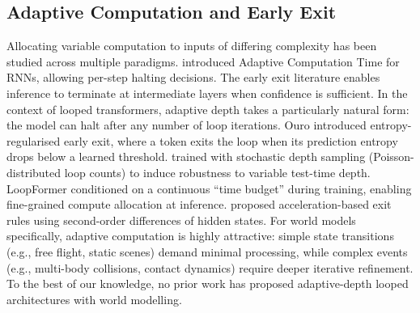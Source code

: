 \subsection{Adaptive Computation and Early Exit}

Allocating variable computation to inputs of differing complexity has been studied across multiple paradigms. \citet{graves2016act} introduced Adaptive Computation Time for RNNs, allowing per-step halting decisions. The early exit literature \citep{teerapittayanon2016branchynet, bolukbasi2017adaptive, earlyexit2025survey} enables inference to terminate at intermediate layers when confidence is sufficient. In the context of looped transformers, adaptive depth takes a particularly natural form: the model can halt after any number of loop iterations. Ouro \citep{zhu2025ouro} introduced entropy-regularised early exit, where a token exits the loop when its prediction entropy drops below a learned threshold. \citet{geiping2025rdm} trained with stochastic depth sampling (Poisson-distributed loop counts) to induce robustness to variable test-time depth. LoopFormer \citep{jeddi2025loopformer} conditioned on a continuous ``time budget'' during training, enabling fine-grained compute allocation at inference. \citet{pappone2025twoscale} proposed acceleration-based exit rules using second-order differences of hidden states. For world models specifically, adaptive computation is highly attractive: simple state transitions (e.g., free flight, static scenes) demand minimal processing, while complex events (e.g., multi-body collisions, contact dynamics) require deeper iterative refinement. To the best of our knowledge, no prior work has proposed adaptive-depth looped architectures with world modelling.


